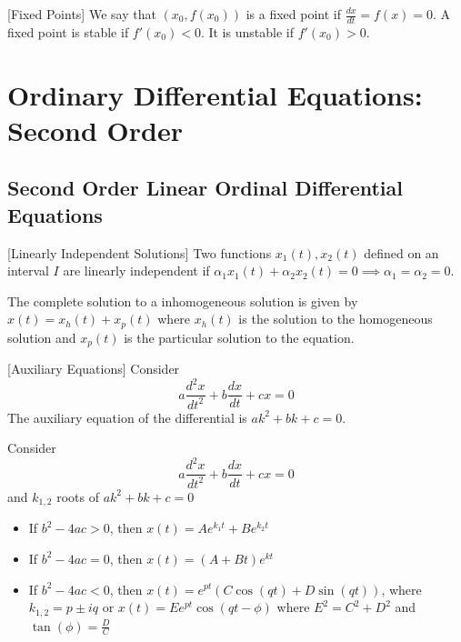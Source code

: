 \documentclass[a4paper]{article}
\begin{document}
\begin{defn}{}{}[Fixed Points] We say that $(x_0,f(x_0))$ is a fixed point if $\frac{dx}{dt}=f(x)=0$. A fixed point is stable if $f'(x_0)<0$. It is unstable if $f'(x_0)>0$. 
\end{defn}

\pagebreak
\section{Ordinary Differential Equations: Second Order}
\subsection{Second Order Linear Ordinal Differential Equations}
\begin{defn}{}{}[Linearly Independent Solutions] Two functions $x_1(t),x_2(t)$ defined on an interval $I$ are linearly independent if $\alpha_1x_1(t)+\alpha_2x_2(t)=0\implies\alpha_1=\alpha_2=0$. 
\end{defn}

\begin{defn}{}{} The complete solution to a inhomogeneous solution is given by $x(t)=x_h(t)+x_p(t)$ where $x_h(t)$ is the solution to the homogeneous solution and $x_p(t)$ is the particular solution to the equation. 
\end{defn}

\begin{defn}{}{}[Auxiliary Equations] Consider $$a\frac{d^2x}{dt^2}+b\frac{dx}{dt}+cx=0$$ The auxiliary equation of the differential is $ak^2+bk+c=0$. 
\end{defn}

\begin{thm}{}{} Consider $$a\frac{d^2x}{dt^2}+b\frac{dx}{dt}+cx=0$$ and $k_{1,2}$ roots of $ak^2+bk+c=0$
\begin{itemize}
\item If $b^2-4ac>0$, then $x(t)=Ae^{k_1t}+Be^{k_2t}$
\item If $b^2-4ac=0$, then $x(t)=(A+Bt)e^{kt}$
\item If $b^2-4ac<0$, then $x(t)=e^{pt}(C\cos(qt)+D\sin(qt))$, where $k_{1,2}=p\pm iq$ or $x(t)=Ee^{pt}\cos(qt-\phi)$ where $E^2=C^2+D^2$ and $\tan(\phi)=\frac{D}{C}$
\end{itemize}
\end{thm}
\end{document}
